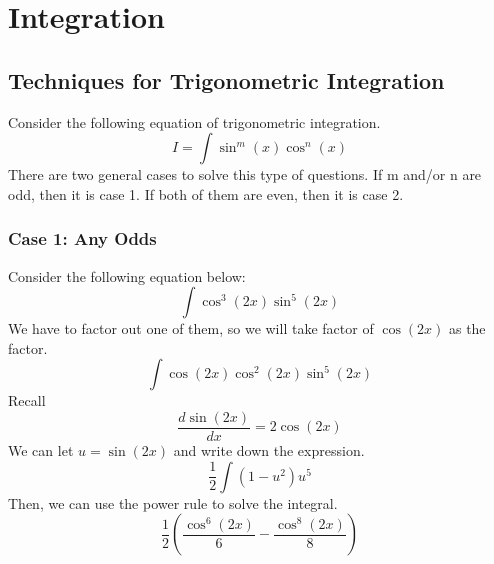 \documentclass{article}
\begin{document}
\section{Integration}
\subsection{Techniques for Trigonometric Integration}
Consider the following equation of trigonometric integration.
\begin{equation*}
  I = \int \sin^m(x) \cos^n(x)
\end{equation*}
There are two general cases to solve this type of questions. If m and/or n are odd, then it is case 1. If both of them are even, then it is case 2.
\subsubsection{Case 1: Any Odds}
Consider the following equation below:
\begin{equation*}
  \int \cos^3(2x) \sin^5(2x)
\end{equation*}
We have to factor out one of them, so we will take factor of $\cos(2x)$ as the factor.
\begin{equation*}
  \int \cos(2x) \cos^2(2x) \sin^5(2x)
\end{equation*}
Recall
\begin{equation*}
  \frac{d\sin(2x)}{dx} = 2\cos(2x)
\end{equation*}
We can let $u = \sin(2x)$ and write down the expression.
\begin{equation*}
  \frac{1}{2} \int (1-u^2)u^5 
\end{equation*}
Then, we can use the power rule to solve the integral.
\begin{equation*}
  \frac{1}{2} (\frac{\cos^6(2x)}{6} - \frac{\cos^8(2x)}{8})
\end{equation*}
\end{document}
